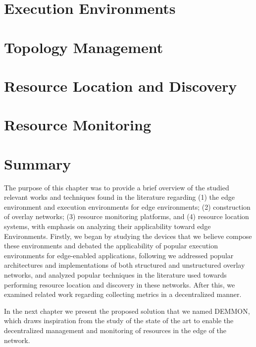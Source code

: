 \section{Execution Environments} \label{sec:runtime_environments} 

\section{Topology Management} \label{sec:topology_management} 

\section{Resource Location and Discovery} \label{sec:res_location} 

\section{Resource Monitoring} \label{sec:res_monitoring} 


\section{Summary}

The purpose of this chapter was to provide a brief overview of the studied relevant works and techniques found in the literature regarding (1) the edge environment and execution environments for edge environments; (2) construction of overlay networks; (3) resource monitoring platforms, and (4) resource location systems, with emphasis on analyzing their applicability toward edge Environments. Firstly, we began by studying the devices that we believe compose these environments and debated the applicability of popular execution environments for edge-enabled applications, following we addressed popular architectures and implementations of both structured and unstructured overlay networks, and analyzed popular techniques in the literature used towards performing resource location and discovery in these networks. After this, we examined related work regarding collecting metrics in a decentralized manner.

In the next chapter we present the proposed solution that we named DEMMON, which draws inspiration from the study of the state of the art to enable the decentralized management and monitoring of resources in the edge of the network.